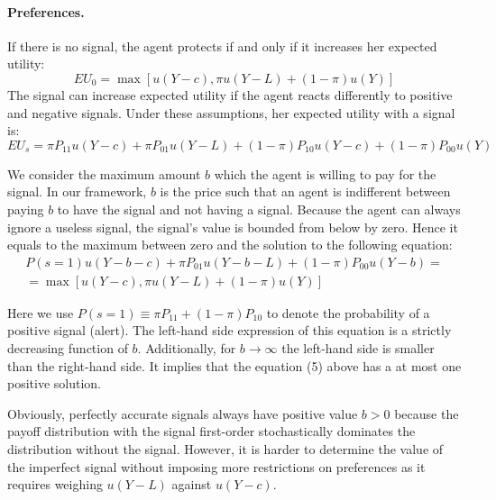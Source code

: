 \documentclass[12pt,a4paper]{article}
\begin{document}
\vspace{10pt}
\paragraph{Preferences.} If there is no signal, the agent protects if and only if it increases her expected utility:
\begin{equation}
EU_0=\max[u(Y-c),\pi u(Y-L)+(1-\pi) u(Y)]
\end{equation}
The signal can increase expected utility if the agent reacts differently to positive and negative signals. Under these assumptions, her expected utility with a signal is:
\begin{equation}
EU_s=\pi P_{11}u(Y-c)+\pi P_{01}u(Y-L)+(1-\pi)P_{10}u(Y-c)+(1-\pi)P_{00}u(Y)
\end{equation}

We consider the maximum amount $b$ which the agent is willing to pay for the signal. In our framework, $b$ is the price such that an agent is indifferent between paying $b$ to have the signal and not having a signal. Because the agent can always ignore a useless signal, the signal's value is bounded from below by zero. Hence it equals to the maximum between zero and the solution to the following equation:
\begin{equation}
\begin{split}
P(s=1)u(Y-b-c)+\pi P_{01}u(Y-b-L)+(1-\pi)P_{00}u(Y-b)=\\=\max[u(Y-c),\pi u(Y-L)+(1-\pi) u(Y)] 
\end{split}
\end{equation}

Here we use $P(s=1)\equiv \pi P_{11}+(1-\pi)P_{10}$ to denote the probability of a positive signal (alert). The left-hand side expression of this equation is a strictly decreasing function of $b$. Additionally, for $b\rightarrow \infty$ the left-hand side is smaller than the right-hand side. It implies that the equation (5) above has a at most one positive solution.

Obviously, perfectly accurate signals always have positive value $b>0$ because the payoff distribution with the signal first-order stochastically dominates the distribution without the signal. 
However, it is harder to determine the value of the imperfect signal without imposing more restrictions on preferences as it requires weighing $u(Y-L)$ against $u(Y-c)$.
\end{document}
